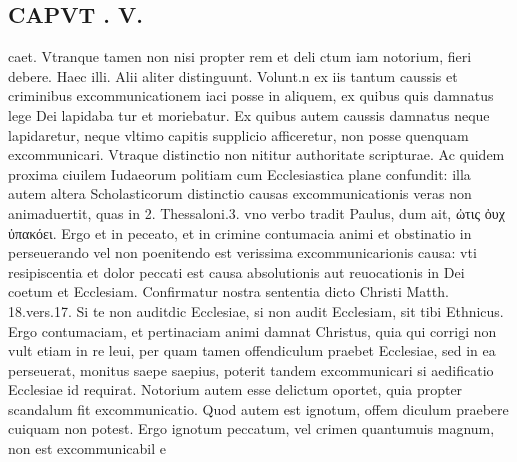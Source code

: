\documentclass{article}
\begin{document}
\begin{pages}
\section*{CAPVT . V. }\pstart caet. Vtranque tamen non nisi propter rem et deli ctum iam notorium, fieri debere. Haec illi. Alii aliter distinguunt. Volunt.n ex iis tantum caussis et criminibus excommunicationem iaci posse in aliquem, ex quibus quis damnatus lege Dei lapidaba tur et moriebatur. Ex quibus autem caussis damnatus neque lapidaretur, neque vltimo capitis supplicio afficeretur, non posse quenquam excommunicari. Vtraque distinctio non nititur authoritate scripturae. Ac quidem proxima ciuilem Iudaeorum politiam cum Ecclesiastica plane confundit: illa autem altera Scholasticorum distinctio causas excommunicationis veras non animaduertit, quas in 2. Thessaloni.3. vno verbo tradit Paulus, dum ait, ὠτις ὀυχ ὐπακόει. Ergo et in peceato, et in crimine contumacia animi et obstinatio in perseuerando vel non poenitendo est verissima excommunicarionis causa: vti resipiscentia et dolor peccati est causa absolutionis aut reuocationis in Dei coetum et Ecclesiam. Confirmatur nostra sententia dicto Christi Matth. 18.vers.17. Si te non auditdic Ecclesiae, si non audit Ecclesiam, sit tibi Ethnicus. Ergo contumaciam, et pertinaciam animi damnat Christus, quia qui corrigi non vult etiam in re leui, per quam tamen offendiculum praebet Ecclesiae, sed in ea perseuerat, monitus saepe saepius, poterit tandem excommunicari si aedificatio Ecclesiae id requirat. Notorium autem esse delictum oportet, quia propter scandalum fit excommunicatio. Quod autem est ignotum, offem diculum praebere cuiquam non potest. Ergo ignotum peccatum, vel crimen quantumuis magnum, non est excommunicabil e\pend

\end{pages}
\end{document}
